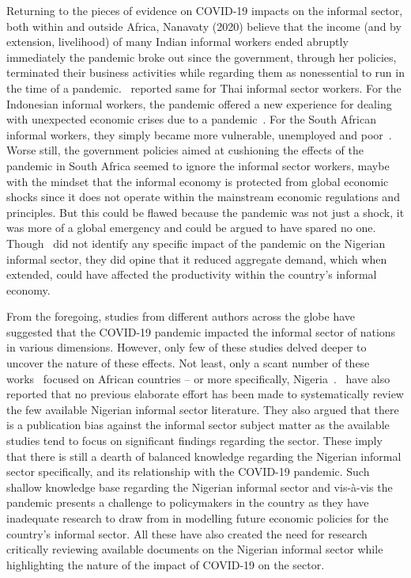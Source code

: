 \documentclass[a4paper, 12pt]{article}
\begin{document}
    Returning to the pieces of evidence on COVID-19 impacts on the informal sector, both within and outside Africa, Nanavaty (2020) believe that the income (and by extension, livelihood) of many Indian informal workers ended abruptly immediately the pandemic broke out since the government, through her policies, terminated their business activities while regarding them as nonessential to run in the time of a pandemic.~\cite{komin2021covid} reported same for Thai informal sector workers. For the Indonesian informal workers, the pandemic offered a new experience for dealing with unexpected economic crises due to a pandemic~\parencite{pitoyo2020impacts}. For the South African informal workers, they simply became more vulnerable, unemployed and poor~\parencite{khambule2022covid}. Worse still, the government policies aimed at cushioning the effects of the pandemic in South Africa seemed to ignore the informal sector workers, maybe with the mindset that the informal economy is protected from global economic shocks since it does not operate within the mainstream economic regulations and principles. But this could be flawed because the pandemic was not just a shock, it was more of a global emergency and could be argued to have spared no one. Though~\cite{nnabuife2020diversity} did not identify any specific impact of the pandemic on the Nigerian informal sector, they did opine that it reduced aggregate demand, which when extended, could have affected the productivity within the country’s informal economy.

    From the foregoing, studies from different authors across the globe have suggested that the COVID-19 pandemic impacted the informal sector of nations in various dimensions. However, only few of these studies delved deeper to uncover the nature of these effects. Not least, only a scant number of these works~\parencite{ohia2020covid, ozili2021covid} focused on African countries – or more specifically, Nigeria~\parencite{nnabuife2020diversity}.~\cite{onyebueke2011informal} have also reported that no previous elaborate effort has been made to systematically review the few available Nigerian informal sector literature. They also argued that there is a publication bias against the informal sector subject matter as the available studies tend to focus on significant findings regarding the sector. These imply that there is still a dearth of balanced knowledge regarding the Nigerian informal sector specifically, and its relationship with the COVID-19 pandemic. Such shallow knowledge base regarding the Nigerian informal sector and vis-à-vis the pandemic presents a challenge to policymakers in the country as they have inadequate research to draw from in modelling future economic policies for the country’s informal sector. All these have also created the need for research critically reviewing available documents on the Nigerian informal sector while highlighting the nature of the impact of COVID-19 on the sector.
\end{document}
